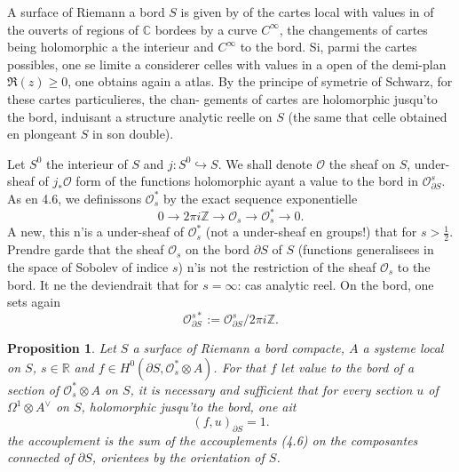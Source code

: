 \documentclass[12pt,a4paper]{article}
\theoremstyle{plain}
\newtheorem{proposition}[theorem]{Proposition}
\theoremstyle{definition}
\theoremstyle{remark}
\newcommand{\cO}{\mathcal{O}}
\newcommand{\Z}{\mathbb{Z}}
\newcommand{\C}{\mathbb{C}}
\newcommand{\R}{\mathbb{R}}
\providecommand{\cO}{\mathcal{O}}
\providecommand{\R}{\mathrm{R}}
\begin{document}
A surface of Riemann a bord $S$ is given by of the cartes local with values in of the ouverts of regions of $\C$ bordees by a curve $C^\infty$, the changements of cartes
being holomorphic a the interieur and $C^\infty$ to the bord. Si, parmi the cartes possibles, one se limite
a considerer celles with values in a open of the demi-plan $\Re(z) \geq 0$, one obtains again
a atlas. By the principe of symetrie of Schwarz, for these cartes particulieres, the chan-
gements of cartes are holomorphic jusqu'to the bord, induisant a structure analytic
reelle on $S$ (the same that celle obtained en plongeant $S$ in son double).

Let $S^0$ the interieur of $S$ and $j : S^0 \hookrightarrow S$. We shall denote $\cO$ the sheaf on $S$, under-
sheaf of $j_*\cO$ form of the functions holomorphic ayant a value to the bord in $\cO_{\partial S}^s$.
As en 4.6, we definissons $\cO_s^*$ by the exact sequence exponentielle
\[
0 \to 2\pi i\Z \to \cO_s \to \cO_s^* \to 0.
\]
A new, this n'is a under-sheaf of $\cO_s^*$ (not a under-sheaf en groups!) that for
$s > \tfrac{1}{2}$. Prendre garde that the sheaf $\cO_s$ on the bord $\partial S$ of $S$ (functions generalisees in
the space of Sobolev of indice $s$) n'is not the restriction of the sheaf $\cO_s$ to the bord. It ne the
deviendrait that for $s = \infty$: cas analytic reel. On the bord, one sets again
\[
\cO_{\partial S}^{s*} := \cO_{\partial S}^s / 2\pi i\Z.
\]

\begin{proposition}
Let $S$ a surface of Riemann a bord compacte, $A$ a systeme local
on $S$, $s \in \R$ and $f \in H^0(\partial S, \cO_s^* \otimes A)$. For that $f$ let value to the bord of a section of $\cO_s^* \otimes A$ on $S$,
it is necessary and sufficient that for every section $u$ of $\Omega^1 \otimes A^\vee$ on $S$, holomorphic jusqu'to the bord, one ait
\[
(f, u)_{\partial S} = 1.
\]
the accouplement is the sum of the accouplements \emph{(4.6)} on the composantes connected
of $\partial S$, orientees by the orientation of $S$.
\end{proposition}
\end{document}
